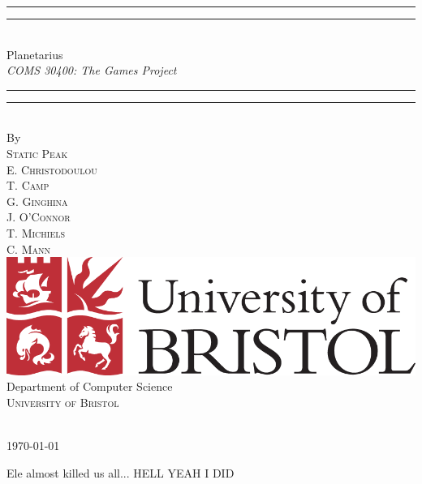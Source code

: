 \documentclass[11pt,a4paper]{article}
\begin{document}
\vspace*{13mm}
\begin{center}
\rule[0.5ex]{\linewidth}{2pt}\vspace*{-\baselineskip}\vspace*{3.2pt}
\rule[0.5ex]{\linewidth}{1pt}\\[\baselineskip]
{\Huge Planetarius }\\[4mm]
{\Large \textit{COMS  30400: The Games Project}}\\
\rule[0.5ex]{\linewidth}{1pt}\vspace*{-\baselineskip}\vspace{3.2pt}
\rule[0.5ex]{\linewidth}{2pt}\\
\vspace{6.5mm}
{\large By}\\
\vspace{6.5mm}
{\large\textsc{{\Huge Static Peak} \\E. Christodoulou\\ T. Camp\\ G. Ginghina\\ J. O'Connor\\ T. Michiels\\ C. Mann}}\\
\vspace{11mm}
\includegraphics[scale=0.2]{logos/brislogo.png}\\
\vspace{6mm}
{\large Department of Computer Science\\
\textsc{University of Bristol}}\\
\vspace{11mm}
\begin{minipage}{10cm}
\end{minipage}\\
\vspace{9mm}
{\large\textsc{\today}}
\vspace{12mm}
\end{center}
\begin{flushright}
  Ele almost killed us all... HELL YEAH I DID
\end{flushright}
\end{document}
